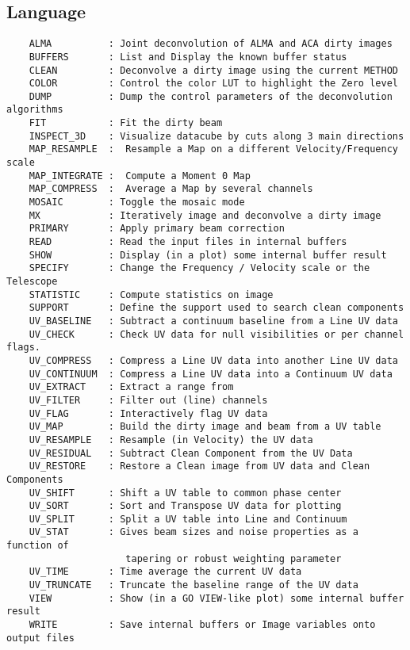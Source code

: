 \subsection{Language}
\begin{verbatim}
    ALMA          : Joint deconvolution of ALMA and ACA dirty images
    BUFFERS       : List and Display the known buffer status
    CLEAN         : Deconvolve a dirty image using the current METHOD
    COLOR         : Control the color LUT to highlight the Zero level
    DUMP          : Dump the control parameters of the deconvolution algorithms
    FIT           : Fit the dirty beam
    INSPECT_3D    : Visualize datacube by cuts along 3 main directions
    MAP_RESAMPLE  :  Resample a Map on a different Velocity/Frequency scale
    MAP_INTEGRATE :  Compute a Moment 0 Map
    MAP_COMPRESS  :  Average a Map by several channels
    MOSAIC        : Toggle the mosaic mode
    MX            : Iteratively image and deconvolve a dirty image
    PRIMARY       : Apply primary beam correction
    READ          : Read the input files in internal buffers
    SHOW          : Display (in a plot) some internal buffer result
    SPECIFY       : Change the Frequency / Velocity scale or the Telescope
    STATISTIC     : Compute statistics on image
    SUPPORT       : Define the support used to search clean components
    UV_BASELINE   : Subtract a continuum baseline from a Line UV data
    UV_CHECK      : Check UV data for null visibilities or per channel flags.
    UV_COMPRESS   : Compress a Line UV data into another Line UV data
    UV_CONTINUUM  : Compress a Line UV data into a Continuum UV data
    UV_EXTRACT    : Extract a range from
    UV_FILTER     : Filter out (line) channels
    UV_FLAG       : Interactively flag UV data
    UV_MAP        : Build the dirty image and beam from a UV table
    UV_RESAMPLE   : Resample (in Velocity) the UV data
    UV_RESIDUAL   : Subtract Clean Component from the UV Data
    UV_RESTORE    : Restore a Clean image from UV data and Clean Components
    UV_SHIFT      : Shift a UV table to common phase center
    UV_SORT       : Sort and Transpose UV data for plotting
    UV_SPLIT      : Split a UV table into Line and Continuum
    UV_STAT       : Gives beam sizes and noise properties as a function of
                     tapering or robust weighting parameter
    UV_TIME       : Time average the current UV data
    UV_TRUNCATE   : Truncate the baseline range of the UV data
    VIEW          : Show (in a GO VIEW-like plot) some internal buffer result
    WRITE         : Save internal buffers or Image variables onto output files

\end{verbatim}
